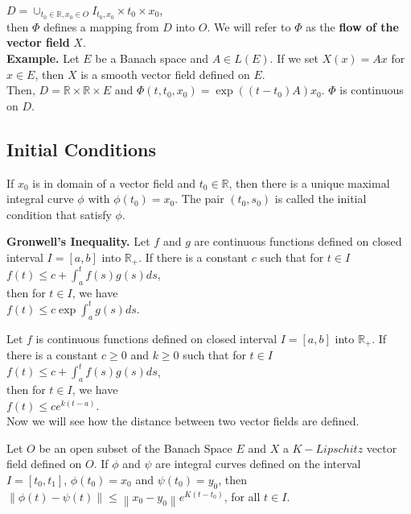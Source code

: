 \documentclass[12 pt]{article}
\theoremstyle{definition}
\theoremstyle{remark}
\newcommand{\R}{\mathbb{R}}
\newcommand\norm[1]{\left\lVert#1\right\rVert}
\begin{document}
{$D = \cup_{t_0 \in \R, x_0 \in O} I_{t_0, x_0} \times {t_0} \times {x_0} $,\\
then $\Phi$ defines a mapping from $D$ into $O$. We will refer to $\Phi$ as the \textbf{flow of the vector field} $X$.\\

\textbf{Example.} Let
$E$ be a Banach space and $A \in L(E)$. If we set $X(x) = Ax$ for $x \in E$, then $X$ is a smooth vector field defined on $E$.\\

Then, $D = \R \times \R \times E$ and $\Phi (t, t_0, x_0) = \exp{((t-t_0)A)} x_0$. $\Phi$ is continuous on $D$.

\subsection{Initial Conditions}
If $x_0$ is in domain of a vector field and $t_0 \in \R$, then there is a unique maximal integral curve $\phi$ with $\phi (t_0) = x_0$. The pair $(t_0, s_0)$ is called the initial condition that satisfy $\phi$.

\lemma \textbf{Gronwell's Inequality. } Let $f$ and $g$ are continuous functions defined on closed interval $I = [a,b]$ into $\R_+$. If there is a constant $c$ such that for $t \in I$\\

\hspace*{4cm} $f(t) \leq c + \int_a^t f(s)g(s) ds$,\\
then for $t \in I$, we have\\
\hspace*{4cm} $f(t) \leq c \exp{\int_a^t g(s)ds}$.

\corollary Let $f$ is continuous functions defined on closed interval $I = [a,b]$ into $\R_+$. If there is a constant $c \geq 0$ and $k \geq 0$ such that for $t \in I$\\

\hspace*{4cm} $f(t) \leq c + \int_a^t f(s)g(s) ds$,\\
then for $t \in I$, we have\\
\hspace*{4cm} $f(t) \leq ce^{k(t-a)}$.\\

\normalfont
Now we will see how the distance between two vector fields are defined.

\theorem Let $O$ be an open subset of the Banach Space $E$ and $X$ a $K-Lipschitz$ vector field defined on $O$. If $\phi$ and $\psi$  are integral curves defined on the interval $I = [t_0, t_1]$, $\phi (t_0) = x_0$ and $\psi (t_0) = y_0$, then\\
\hspace*{5cm} $\norm{\phi (t) - \psi(t)} \leq \norm{x_0 - y_0} e^{K(t-t_0)}$, for all $t \in I$.
\normalfont
}
\end{document}
